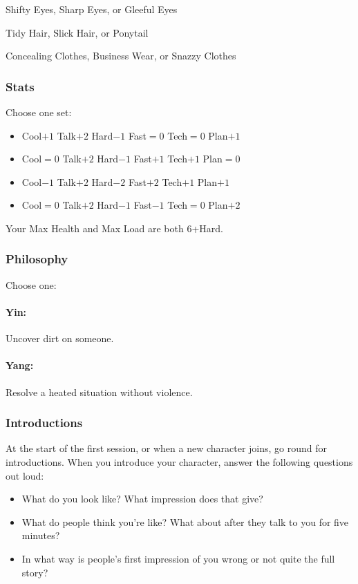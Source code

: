 Shifty Eyes, Sharp Eyes, or Gleeful Eyes

Tidy Hair, Slick Hair, or Ponytail

Concealing Clothes, Business Wear, or Snazzy Clothes

\subsubsection{Stats}
Choose one set:
\begin{itemize}
\setlength\itemsep{0em}
\item Cool$+1$ Talk$+2$ Hard$-1$ Fast${=}0$ Tech${=}0$ Plan$+1$
\item Cool${=}0$ Talk$+2$ Hard$-1$ Fast$+1$ Tech$+1$ Plan${=}0$
\item Cool$-1$ Talk$+2$ Hard$-2$ Fast$+2$ Tech$+1$ Plan$+1$
\item Cool${=}0$ Talk$+2$ Hard$-1$ Fast$-1$ Tech${=}0$ Plan$+2$
\end{itemize}

Your Max Health and Max Load are both 6+Hard.

\subsubsection{Philosophy}
Choose one:
\paragraph{Yin:} Uncover dirt on someone.
\paragraph{Yang:} Resolve a heated situation without violence.

\subsubsection{Introductions}
At the start of the first session, or when a new character joins, go round for introductions.
When you introduce your character, answer the following questions out loud:
\begin{itemize}
\item What do you look like? What impression does that give?
\item What do people think you're like? What about after they talk to you for five minutes?
\item In what way is people's first impression of you wrong or not quite the full story?
\end{itemize}

